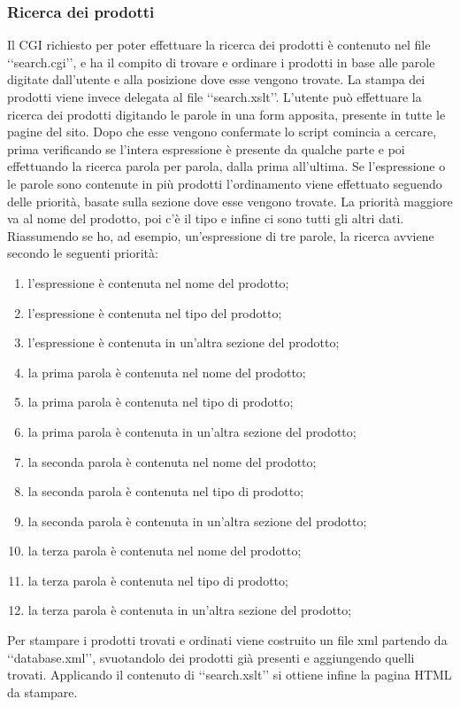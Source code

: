 {{		\subsubsection{Ricerca dei prodotti}
			Il CGI richiesto per poter effettuare la ricerca dei prodotti è contenuto nel file ‘‘search.cgi’’, e ha il compito di trovare e ordinare i prodotti in base alle parole digitate dall'utente e alla posizione dove esse vengono trovate. La stampa dei prodotti viene invece delegata al file ‘‘search.xslt’’.
			L'utente può effettuare la ricerca dei prodotti digitando le parole in una form apposita, presente in tutte le pagine del sito. Dopo che esse vengono confermate lo script comincia a cercare, prima verificando se l'intera espressione è presente da qualche parte e poi effettuando la ricerca parola per parola, dalla prima all'ultima. Se l'espressione o le parole sono contenute in più prodotti l'ordinamento viene effettuato seguendo delle priorità, basate sulla sezione dove esse vengono trovate. La priorità maggiore va al nome del prodotto, poi c'è il tipo e infine ci sono tutti gli altri dati.
			Riassumendo se ho, ad esempio, un'espressione di tre parole, la ricerca avviene secondo le seguenti priorità:
			\begin{enumerate}
				\item l'espressione è contenuta nel nome del prodotto;
				\item l'espressione è contenuta nel tipo del prodotto;
				\item l'espressione è contenuta in un'altra sezione del prodotto;
				\item la prima parola è contenuta nel nome del prodotto;
				\item la prima parola è contenuta nel tipo di prodotto;
				\item la prima parola è contenuta in un'altra sezione del prodotto;
				\item la seconda parola è contenuta nel nome del prodotto;
				\item la seconda parola è contenuta nel tipo di prodotto;
				\item la seconda parola è contenuta in un'altra sezione del prodotto;
				\item la terza parola è contenuta nel nome del prodotto;
				\item la terza parola è contenuta nel tipo di prodotto;
				\item la terza parola è contenuta in un'altra sezione del prodotto;
			\end{enumerate}
			Per stampare i prodotti trovati e ordinati viene costruito un file xml partendo da ‘‘database.xml’’, svuotandolo dei prodotti già presenti e aggiungendo quelli trovati. Applicando il contenuto di ‘‘search.xslt’’ si ottiene infine la pagina HTML da stampare.
}}
